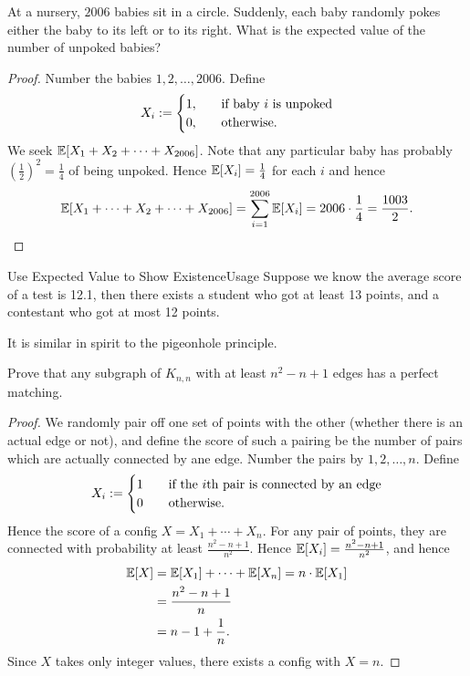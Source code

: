 \begin{example}[exp:]{}
    At a nursery, $2006$ babies sit in a circle. Suddenly, each baby randomly pokes either the baby to its left or to its right. What is the expected value of the number of unpoked babies?
\end{example}

\begin{proof}
    Number the babies $1,2,\dots ,2006$. Define
    \[X_i:=
        \begin{cases}
            1,&\quad \textnormal{if baby $i$ is unpoked}\\
            0,&\quad \textnormal{otherwise}.
        \end{cases}
    \]
    We seek $\mathbb{E}[X_1+X_2+\cdots +X_{2006}]$. Note that any particular baby has probably $(\frac{1}{2})^2=\frac{1}{4}$ of being unpoked. Hence $\mathbb{E}[X_i]=\frac{1}{4}$ for each $i$ and hence
    \[\mathbb{E}[X_1+\cdots +X_2+\cdots +X_{2006}]=\sum_{i=1}^{2006}\mathbb{E}[X_i]=2006\cdot \frac{1}{4}=\frac{1003}{2}.\]
\end{proof}

\begin{newenv}[rnd:]{Use Expected Value to Show Existence}{Usage}
    Suppose we know the average score of a test is 12.1, then there exists a student who got at least 13 points, and a contestant who got at most 12 points.    
\end{newenv}

\begin{remark}
    It is similar in spirit to the pigeonhole principle.
\end{remark}

\begin{example}[exp:]{}
    Prove that any subgraph of $K_{n,n}$ with at least $n^2-n+1$ edges has a perfect matching.
\end{example}

\begin{proof}
    We randomly pair off one set of points with the other (whether there is an actual edge or not), and define the score of such a pairing be the number of pairs which are actually connected by ane edge. Number the pairs by $1,2,\dots ,n$. Define
    \[X_i:=
        \begin{cases}
            1&\quad \textnormal{if the $i$th pair is connected by an edge}\\
            0&\quad \textnormal{otherwise}.
        \end{cases}
    \]
    Hence the score of a config $X=X_1+\cdots +X_n$. For any pair of points, they are connected with probability at least $\frac{n^2-n+1}{n^2}$. Hence $\mathbb{E}[X_i]=\frac{n^2-n+1}{n^2}$, and hence
    \begin{alignat*}{1}
        \mathbb{E}[X]&= \mathbb{E}[X_1]+\cdots +\mathbb{E}[X_n] = n\cdot \mathbb{E}[X_1]\\
              &= \frac{n^2-n+1}{n}\\
              &= n-1+\frac{1}{n}.
    \end{alignat*}
    Since $X$ takes only integer values, there exists a config with $X=n$.
\end{proof}

